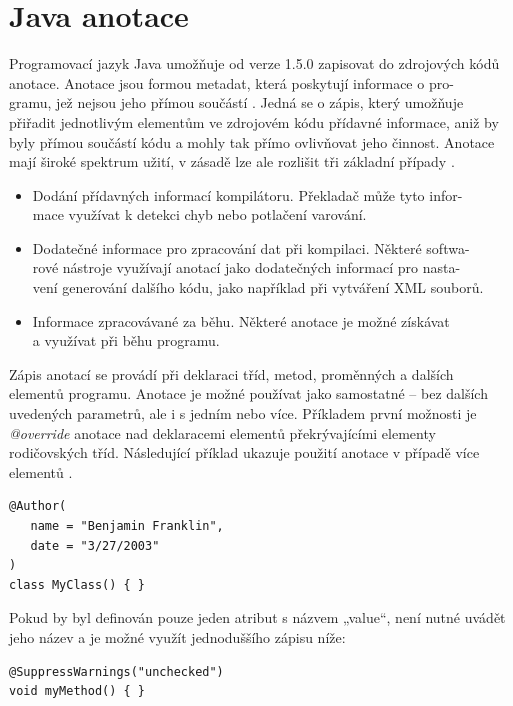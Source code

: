 \documentclass{projekt}
\begin{document}
\section{Java anotace}
\hspace{0.65cm}Programovací jazyk Java umožňuje od verze 1.5.0 zapisovat do zdrojových kódů anotace. Anotace jsou formou metadat, která poskytují informace o pro-\\gramu, jež nejsou jeho přímou součástí \cite{jedenact}. Jedná se o zápis, který umožňuje přiřadit jednotlivým elementům ve zdrojovém kódu přídavné informace, aniž by byly přímou součástí kódu a mohly tak přímo ovlivňovat jeho činnost. Anotace mají široké spektrum užití, v zásadě lze ale rozlišit tři základní případy \cite{dvanact}.

\begin{itemize}
\item Dodání přídavných informací kompilátoru. Překladač může tyto infor-\\mace využívat k detekci chyb nebo potlačení varování.
\item Dodatečné informace pro zpracování dat při kompilaci. Některé softwa-\\rové nástroje využívají anotací jako dodatečných informací pro nasta-\\vení generování dalšího kódu, jako například při vytváření XML souborů.
\item Informace zpracovávané za běhu. Některé anotace je možné získávat\\ 
a využívat při běhu programu.
\end{itemize}

Zápis anotací se provádí při deklaraci tříd, metod, proměnných a dalších elementů programu. Anotace je možné používat jako samostatné – bez dalších uvedených parametrů, ale i s jedním nebo více. Příkladem první možnosti je {\it @override} anotace nad deklaracemi elementů překrývajícími elementy rodičovských tříd. Následující příklad ukazuje použití anotace v případě více elementů \cite{dvanact}.

\begin{verbatim}
@Author(
   name = "Benjamin Franklin",
   date = "3/27/2003"
)
class MyClass() { }
\end{verbatim}

Pokud by byl definován pouze jeden atribut s názvem „value“, není nutné uvádět jeho název a je možné využít jednoduššího zápisu níže:

\begin{verbatim}
@SuppressWarnings("unchecked")
void myMethod() { }
\end{verbatim}
\end{document}
